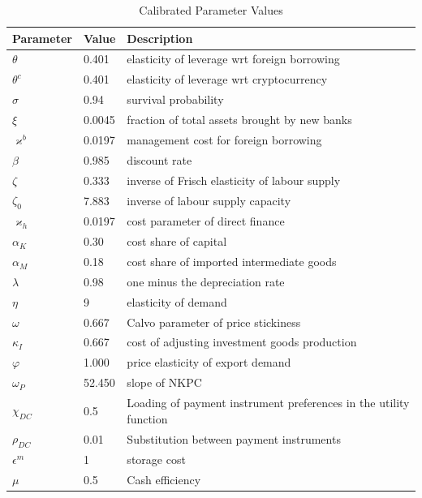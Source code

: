 \documentclass[12pt, a4paper]{article}
\begin{document}
\begin{table}[H]
\caption {\label{calib} Calibrated Parameter Values} 
\begin{tabular}{lll}
 \hline
 \textbf{Parameter} & \textbf{Value}  &  \textbf{Description}  \\ 
 \hline
$\theta$ 	 & 	 0.401 	 & 	 elasticity of leverage wrt foreign borrowing\\
$\theta^c$ 	 & 	 0.401 	 & 	 elasticity of leverage wrt cryptocurrency\\
$\sigma$ 	 & 	 0.94 	 & 	 survival probability\\
$\xi$ 	 & 	 0.0045 	 & 	 fraction of total assets brought by new banks\\
$\varkappa^{b}$ 	 & 	 0.0197 	 & 	 management cost for foreign borrowing\\
$\beta$ 	 & 	 0.985 	 & 	 discount rate\\
$\zeta$ 	 & 	 0.333 	 & 	 inverse of Frisch elasticity of labour supply\\
$\zeta_{0}$ 	 & 	 7.883 	 & 	 inverse of labour supply capacity\\
$\varkappa_{h}$ 	 & 	 0.0197 	 & 	 cost parameter of direct finance\\
$\alpha_{K}$ 	 & 	 0.30 	 & 	 cost share of capital\\
$\alpha_{M}$ 	 & 	 0.18 	 & 	 cost share of imported intermediate goods\\
$\lambda$ 	 & 	 0.98 	 & 	 one minus the depreciation rate\\
$\eta$ 	 & 	 9	 & 	 elasticity of demand\\
$\omega$ 	 & 	 0.667 	 & 	 Calvo parameter of price stickiness\\
$\kappa_{I}$ 	 & 	 0.667 	 & 	 cost of adjusting investment goods production\\
$\varphi$ 	 & 	 1.000 	 & 	 price elasticity of export demand\\
$\omega_P$ 	 & 	 52.450 	 & 	 slope of NKPC\\
$\chi_{DC}$ 	& 	 0.5	 & 	 Loading of payment instrument preferences in the utility function\\
$\rho_{DC}$ 	 & 	 0.01	 & 	 Substitution between payment instruments\\
$\epsilon^m$ 	 & 	 1 & 	storage cost\\
$\mu$ 	 & 	 0.5 & 	Cash efficiency\\

\end{tabular}
\end{table}
\end{document}
